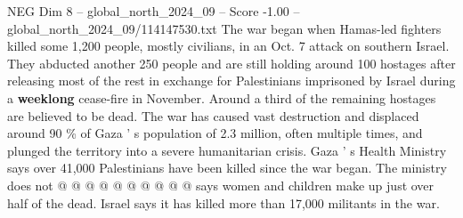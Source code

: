 \begin{textsample}{NEG Dim 8 – global\_north\_2024\_09 – Score -1.00 – global\_north\_2024\_09/114147530.txt}
The war began when Hamas-led fighters killed some 1,200 people, mostly civilians, in an Oct. 7 attack on southern Israel.
They abducted another 250 people and are still holding around 100 hostages after releasing most of the rest in exchange for Palestinians imprisoned by Israel during a \textbf{weeklong} cease-fire in November.
Around a third of the remaining hostages are believed to be dead.
The war has caused vast destruction and displaced around 90 \% of Gaza ' s population of 2.3 million, often multiple times, and plunged the territory into a severe humanitarian crisis.
Gaza ' s Health Ministry says over 41,000 Palestinians have been killed since the war began.
The ministry does not @ @ @ @ @ @ @ @ @ @ says women and children make up just over half of the dead.
Israel says it has killed more than 17,000 militants in the war.

\end{textsample}
